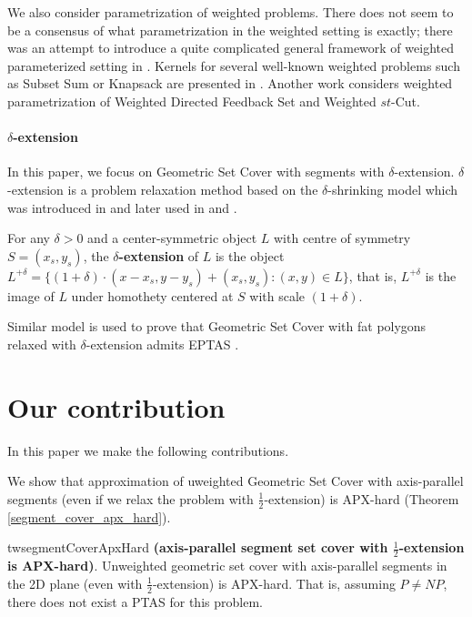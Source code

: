 We also consider parametrization of weighted problems.
There does not seem to be a consensus of what parametrization
in the weighted setting is exactly; there
was an attempt to introduce a quite complicated general
framework of weighted parameterized setting in \cite{weighted_framework}.
Kernels for several well-known weighted problems
such as Subset Sum or Knapsack are presented in \cite{kernel_weighted}.
Another work \cite{weighted_flow} considers weighted
parametrization of Weighted Directed Feedback Set and Weighted $st$-Cut.

\paragraph{$\delta$-extension}
In this paper, we focus on Geometric Set Cover with segments with $\delta$-extension.
$\delta$-extension is a problem relaxation method based on the
$\delta$-shrinking model which was introduced in \cite{shrinking_original}
and later used in \cite{shrinking2} and \cite{shrinking1}.

\begin{defi}
\label{definition:delta_extension}
For any $\delta > 0$ and a center-symmetric object $L$ with
centre of symmetry $S = (x_s, y_s)$,
the \textbf{$\delta$-extension} of $L$ is the object $L^{+\delta} =
\{(1 + \delta)\cdot(x - x_s, y - y_s) + (x_s, y_s) : (x, y) \in L\}$,
that is, $L^{+\delta}$ is the image of $L$ under homothety centered
at $S$ with scale $(1+\delta)$.
\end{defi}

Similar model is used to prove that Geometric Set Cover with fat polygons
relaxed with $\delta$-extension admits EPTAS \cite{harpeled12}.

\section*{Our contribution}
In this paper we make the following contributions.

We show that approximation of uweighted Geometric Set Cover with axis-parallel segments
(even if we relax the problem with  $\frac{1}{2}$-extension) is APX-hard
(Theorem \ref{segment_cover_apx_hard}).

\begin{restatable}{tw}{segmentCoverApxHard}{
\label{segment_cover_apx_hard}
	\textbf{(axis-parallel segment set cover with $\frac{1}{2}$-extension is APX-hard)}.	
	Unweighted geometric set cover
	with axis-parallel segments in the 2D plane
	(even with $\frac{1}{2}$-extension) is APX-hard.
	That is, assuming $P\neq NP$, there does not exist a PTAS
	for this problem.
}\end{restatable}

